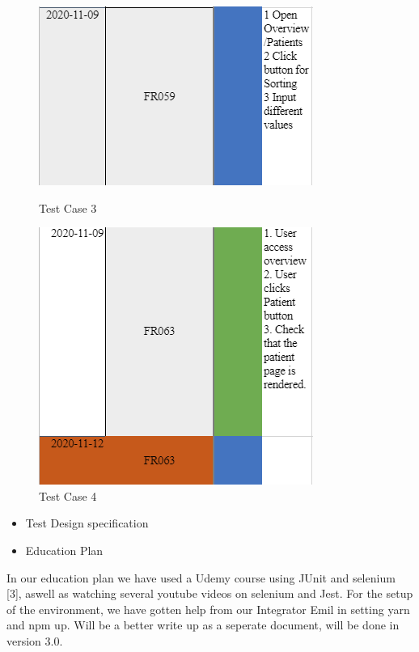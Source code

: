 \begin{figure}[ht!]
\begin{minipage}[t]{0.5\textwidth}
    \centering
    \includegraphics[scale=0.75]{Pictures/TestCase3.PNG}
    \caption{Test Case 3}
\end{minipage}%
\begin{minipage}[t]{0.5\textwidth}
    \centering
    \includegraphics[scale=0.75]{Pictures/TestCase4.PNG}
    \caption{Test Case 4}
\end{minipage}
\end{figure}

\begin{itemize}

    \item{Test Design specification}
    \item{Education Plan}
    \end{itemize}
    In our education plan we have used a Udemy course using JUnit and selenium [3], aswell as watching several youtube videos on selenium and Jest. For the setup of the environment, we have gotten help from our Integrator Emil in setting yarn and npm up. Will be a better write up as a seperate document, will be done in version 3.0.

